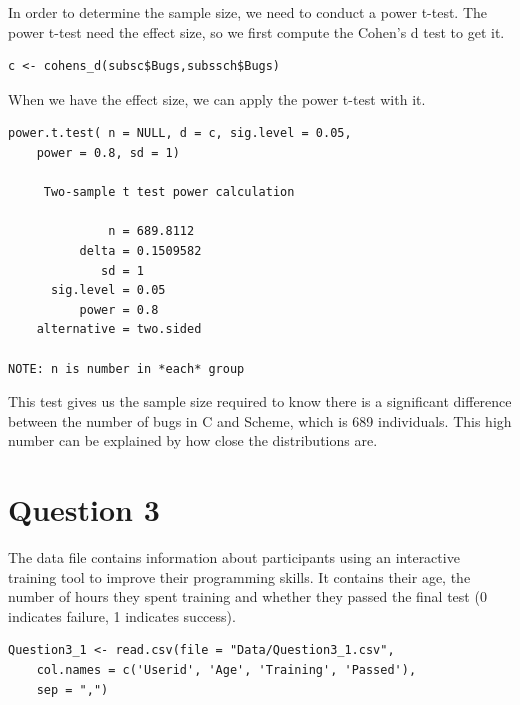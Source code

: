 \documentclass[12pt,a4paper]{scrartcl}
\begin{document}
In order to determine the sample size, we need to conduct a power t-test. The power t-test need the effect size, so we first compute the Cohen's d test to get it.

\begin{lstlisting}[frame=single]
c <- cohens_d(subsc$Bugs,subssch$Bugs)
\end{lstlisting}

When we have the effect size, we can apply the power t-test with it.
\begin{lstlisting}[frame=single]
power.t.test( n = NULL, d = c, sig.level = 0.05, 
    power = 0.8, sd = 1)

     Two-sample t test power calculation 

              n = 689.8112
          delta = 0.1509582 
             sd = 1
      sig.level = 0.05
          power = 0.8
    alternative = two.sided

NOTE: n is number in *each* group
\end{lstlisting}
This test gives us the sample size required to know there is a significant difference between the number of bugs in C and Scheme, which is 689 individuals. This high number can be explained by how close the distributions are.


\section{Question 3}
The data file contains information about participants using an interactive training tool to improve their programming skills. It contains their age, the number of hours they spent training and whether they passed the final test (0 indicates failure, 1 indicates success).

\begin{lstlisting}[frame=single]
Question3_1 <- read.csv(file = "Data/Question3_1.csv",
    col.names = c('Userid', 'Age', 'Training', 'Passed'), 
    sep = ",")
\end{lstlisting}
\end{document}
